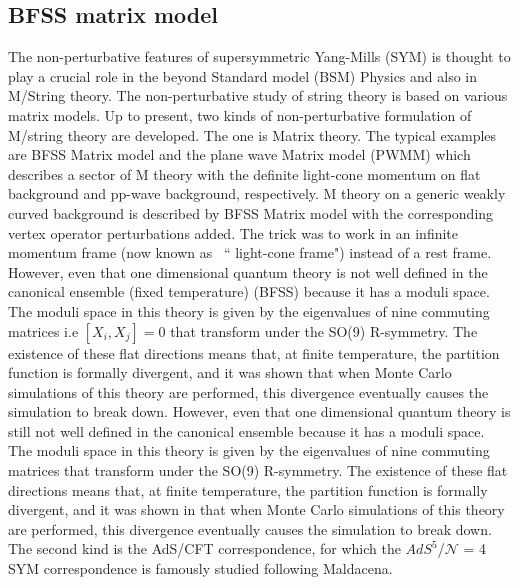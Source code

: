 \documentclass[11pt]{article}
\begin{document}









\subsection{BFSS matrix model}

The non-perturbative features of supersymmetric Yang-Mills (SYM) is thought to play a crucial role in the beyond Standard model (BSM) Physics and also in M/String theory. The non-perturbative study of string theory is based on various matrix models. Up to present, two kinds of non-perturbative formulation of
M/string theory are developed. The one is Matrix theory.
The typical examples are BFSS Matrix model and the
plane wave Matrix model (PWMM) which  describes a sector
of M theory with the definite light-cone momentum on flat
background and pp-wave background, respectively. M theory
on a generic weakly curved background is described by
BFSS Matrix model with the corresponding vertex operator
perturbations added. The trick was to work in an infinite momentum frame (now known as ~`` light-cone frame") instead of a rest frame. However,
even that one dimensional quantum theory is not well defined in the canonical
ensemble (fixed temperature) (BFSS) because it has a moduli space. The moduli space in this theory is given
by the eigenvalues of nine commuting matrices i.e $ [X_{i}, X_{j}] = 0 $  that transform under the SO(9) R-symmetry.
The existence of these flat directions means that, at finite temperature,
the partition function is formally divergent, and it was shown that when Monte
Carlo simulations of this theory are performed, this divergence eventually causes the
simulation to break down.  However,
even that one dimensional quantum theory is still not well defined in the canonical
ensemble because it has a moduli space. The moduli space in this theory is given
by the eigenvalues of nine commuting matrices that transform under the SO(9) R-symmetry.
The existence of these flat directions means that, at finite temperature,
the partition function is formally divergent, and it was shown in that when Monte
Carlo simulations of this theory are performed, this divergence eventually causes the
simulation to break down. The second kind is the AdS/CFT
correspondence, for which the $AdS^{5}$/$\mathcal{N}$ = 4 SYM correspondence is famously studied following Maldacena.  
\end{document}
